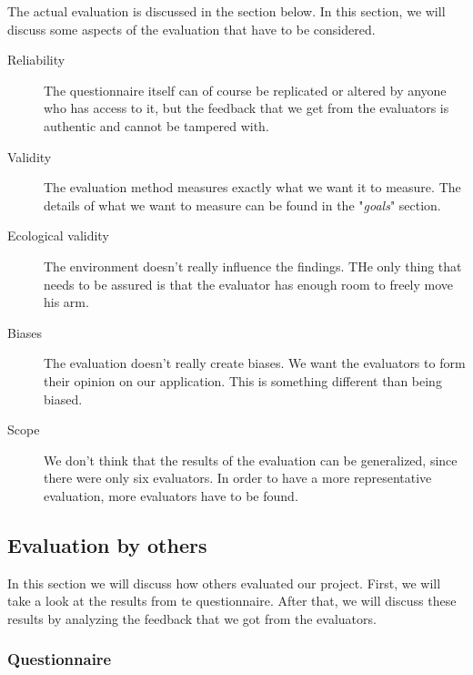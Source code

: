 \documentclass{article}
\begin{document}
The actual evaluation is discussed in the section below. In this section, we will discuss some aspects of the evaluation that have to be considered.
\begin{description}
\item[Reliability] The questionnaire itself can of course be replicated or altered by anyone who has access to it, but the feedback that we get from the evaluators is authentic and cannot be tampered with.
\item[Validity] The evaluation method measures exactly what we want it to measure. The details of what we want to measure can be found in the "\textit{goals}" section.
\item[Ecological validity] The environment doesn't really influence the findings. THe only thing that needs to be assured is that the evaluator has enough room to freely move his arm.
\item[Biases] The evaluation doesn't really create biases. We want the evaluators to form their opinion on our application. This is something different than being biased.
\item[Scope] We don't think that the results of the evaluation can be generalized, since there were only six evaluators. In order to have a more representative evaluation, more evaluators have to be found.
\end{description}

\subsection{Evaluation by others}
In this section we will discuss how others evaluated our project. First, we will take a look at the results from te questionnaire. After that, we will discuss these results by analyzing the feedback that we got from the evaluators.
\subsubsection{Questionnaire}
\end{document}
